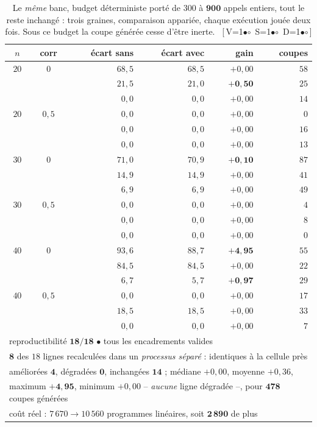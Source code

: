 \documentclass[11pt,a4paper]{article}
\theoremstyle{plain}
\theoremstyle{remark}
\newcommand{\cfgm}[1]{\ifnum#1=1$\bullet$\else$\circ$\fi}
\newcommand{\conf}[3]{%
  \textsf{\footnotesize[\,V\cfgm{#1}\ S\cfgm{#2}\ D\cfgm{#3}\,]}}
\begin{document}
\begin{table}[H]
\centering
\caption{Le \emph{même} banc, budget déterministe porté de $300$ à
$\mathbf{900}$ appels entiers, tout le reste inchangé : trois graines,
comparaison appariée, chaque exécution jouée deux fois. Sous ce budget la
coupe générée cesse d'être inerte.\ \conf{1}{1}{1}}
\label{tab:cglp900}
\setlength{\tabcolsep}{5pt}\small
\begin{tabular}{ccrrrr}
\toprule
$n$ & corr & écart sans & écart avec & gain & coupes\\
\midrule
$20$ & $0$ & $68{,}5$ & $68{,}5$ & $+0{,}00$ & $58$\\
     &        & $21{,}5$ & $21{,}0$ & $\mathbf{+0{,}50}$ & $25$\\
     &        & $0{,}0$ & $0{,}0$ & $+0{,}00$ & $14$\\
$20$ & $0{,}5$ & $0{,}0$ & $0{,}0$ & $+0{,}00$ & $0$\\
     &        & $0{,}0$ & $0{,}0$ & $+0{,}00$ & $16$\\
     &        & $0{,}0$ & $0{,}0$ & $+0{,}00$ & $13$\\
$30$ & $0$ & $71{,}0$ & $70{,}9$ & $\mathbf{+0{,}10}$ & $87$\\
     &        & $14{,}9$ & $14{,}9$ & $+0{,}00$ & $41$\\
     &        & $6{,}9$ & $6{,}9$ & $+0{,}00$ & $49$\\
$30$ & $0{,}5$ & $0{,}0$ & $0{,}0$ & $+0{,}00$ & $4$\\
     &        & $0{,}0$ & $0{,}0$ & $+0{,}00$ & $8$\\
     &        & $0{,}0$ & $0{,}0$ & $+0{,}00$ & $0$\\
$40$ & $0$ & $93{,}6$ & $88{,}7$ & $\mathbf{+4{,}95}$ & $55$\\
     &        & $84{,}5$ & $84{,}5$ & $+0{,}00$ & $22$\\
     &        & $6{,}7$ & $5{,}7$ & $\mathbf{+0{,}97}$ & $29$\\
$40$ & $0{,}5$ & $0{,}0$ & $0{,}0$ & $+0{,}00$ & $17$\\
     &        & $18{,}5$ & $18{,}5$ & $+0{,}00$ & $33$\\
     &        & $0{,}0$ & $0{,}0$ & $+0{,}00$ & $7$\\
\midrule
\multicolumn{6}{l}{reproductibilité $\mathbf{18/18}$ \quad$\bullet$\quad
 tous les encadrements valides}\\
\multicolumn{6}{l}{$\mathbf{8}$ des $18$ lignes recalculées dans un
 \emph{processus séparé} : identiques à la cellule près}\\
\multicolumn{6}{l}{améliorées $\mathbf{4}$, dégradées $\mathbf{0}$,
 inchangées $\mathbf{14}$ ; médiane $+0{,}00$, moyenne $+0{,}36$,}\\
\multicolumn{6}{l}{\quad maximum $\mathbf{+4{,}95}$, minimum $+0{,}00$
 -- \emph{aucune} ligne dégradée --, pour $\mathbf{478}$ coupes générées}\\
\multicolumn{6}{l}{coût réel : $7\,670 \to 10\,560$ programmes linéaires,
 soit $\mathbf{2\,890}$ de plus}\\
\bottomrule
\end{tabular}
\end{table}
\end{document}
